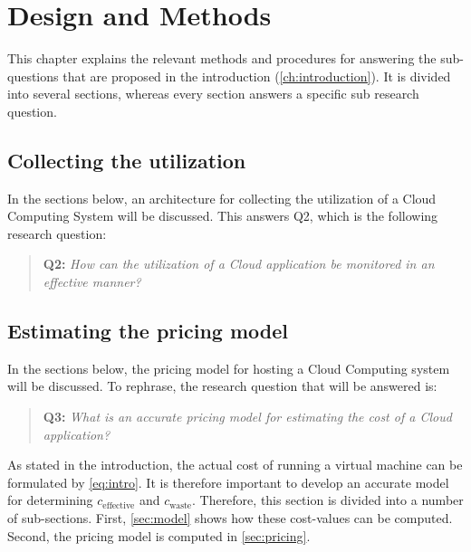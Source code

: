 \chapter{Design and Methods}\label{ch:methods}
This chapter explains the relevant methods and procedures for answering the sub-questions that are proposed in the introduction (\autoref{ch:introduction}). It is divided into several sections, whereas every section answers a specific sub research question.

\section{Collecting the utilization} \label{sec:collect_utilization}
In the sections below, an architecture for collecting the utilization of a Cloud Computing System will be discussed. This answers Q2, which is the following research question:

\begin{quote}
	\textbf{Q2: }\textit{How can the utilization of a Cloud application be monitored in an effective manner?}\\
\end{quote}


\section{Estimating the pricing model} \label{sec:cost}
In the sections below, the pricing model for hosting a Cloud Computing system will be discussed. To rephrase, the research question that will be answered is:

\begin{quote}
	\textbf{Q3: }\textit{What is an accurate pricing model for estimating the cost of a Cloud application?}\\
\end{quote}

As stated in the introduction, the actual cost of running a virtual machine can be formulated by \autoref{eq:intro}. It is therefore important to develop an accurate model for determining $c_\text{effective}$ and $c_\text{waste}$. Therefore, this section is divided into a number of sub-sections. First, \autoref{sec:model} shows how these cost-values can be computed. Second, the pricing model is computed in \autoref{sec:pricing}.

